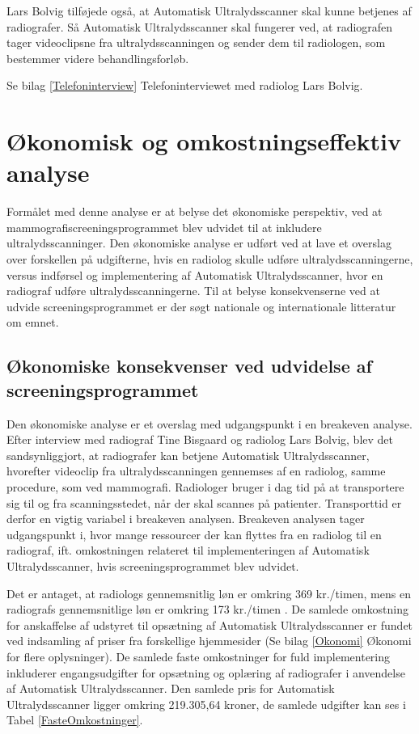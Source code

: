 Lars Bolvig tilføjede også, at Automatisk Ultralydsscanner skal kunne betjenes af radiografer. Så Automatisk Ultralydsscanner skal fungerer ved, at radiografen tager videoclipsne fra ultralydsscanningen og sender dem til radiologen, som bestemmer videre behandlingsforløb.

Se bilag \ref{Telefoninterview} Telefoninterviewet med radiolog Lars Bolvig. 

\section{Økonomisk og omkostningseffektiv analyse}
Formålet med denne analyse er at belyse det økonomiske perspektiv, ved at mammografiscreeningsprogrammet blev udvidet til at inkludere ultralydsscanninger. Den økonomiske analyse er udført ved at lave et overslag over forskellen på udgifterne, hvis en radiolog skulle udføre ultralydsscanningerne, versus indførsel og implementering af Automatisk Ultralydsscanner, hvor en radiograf udføre ultralydsscanningerne. Til at belyse konsekvenserne ved at udvide screeningsprogrammet er der søgt nationale og internationale litteratur om emnet. 

\subsection{Økonomiske konsekvenser ved udvidelse af screeningsprogrammet} 
Den økonomiske analyse er et overslag med udgangspunkt i en breakeven analyse. Efter interview med radiograf Tine Bisgaard og radiolog Lars Bolvig, blev det sandsynliggjort, at radiografer kan betjene Automatisk Ultralydsscanner, hvorefter videoclip fra ultralydsscanningen gennemses af en radiolog, samme procedure, som ved mammografi. 
Radiologer bruger i dag tid på at transportere sig til og fra scanningsstedet, når der skal scannes på patienter. Transporttid er derfor en vigtig variabel i breakeven analysen. Breakeven analysen tager udgangspunkt i, hvor mange ressourcer der kan flyttes fra en radiolog til en radiograf, ift. omkostningen relateret til implementeringen af Automatisk Ultralydsscanner, hvis screeningsprogrammet blev udvidet. 

Det er antaget, at radiologs gennemsnitlig løn er omkring 369 kr./timen, mens en radiografs gennemsnitlige løn er omkring 173 kr./timen \cite{Lon}. De samlede omkostning for anskaffelse af udstyret til opsætning af Automatisk Ultralydsscanner er fundet ved indsamling af priser fra forskellige hjemmesider (Se bilag \ref{Okonomi} Økonomi for flere oplysninger). De samlede faste omkostninger for fuld implementering inkluderer engangsudgifter for opsætning og oplæring af radiografer i anvendelse af Automatisk Ultralydsscanner. Den samlede pris for Automatisk Ultralydsscanner ligger omkring 219.305,64 kroner, de samlede udgifter kan ses i Tabel \ref{FasteOmkostninger}. 


